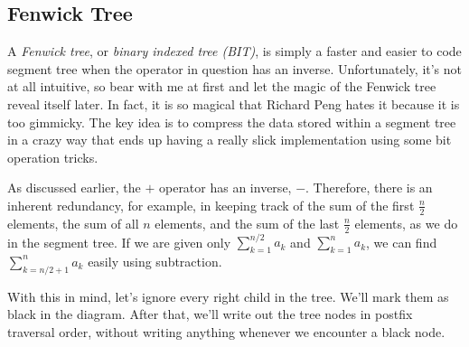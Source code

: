 \documentclass[11pt]{book}
\begin{document}
\subsection{Fenwick Tree}

A \textit{Fenwick tree}, or \textit{binary indexed tree (BIT)}, is simply a faster and easier to code segment tree when the operator in question has an inverse. Unfortunately, it's not at all intuitive, so bear with me at first and let the magic of the Fenwick tree reveal itself later. In fact, it is so magical that Richard Peng hates it because it is too gimmicky. The key idea is to compress the data stored within a segment tree in a crazy way that ends up having a really slick implementation using some bit operation tricks.

As discussed earlier, the $+$ operator has an inverse, $-$. Therefore, there is an inherent redundancy, for example, in keeping track of the sum of the first $\frac{n}{2}$ elements, the sum of all $n$ elements, and the sum of the last $\frac{n}{2}$ elements, as we do in the segment tree. If we are given only $\sum_{k=1}^{n/2} a_k$ and $\sum_{k=1}^n a_k$, we can find $\sum_{k=n/2+1}^{n} a_k$ easily using subtraction.

With this in mind, let's ignore every right child in the tree. We'll mark them as black in the diagram. After that, we'll write out the tree nodes in postfix traversal order, without writing anything whenever we encounter a black node.
\end{document}
